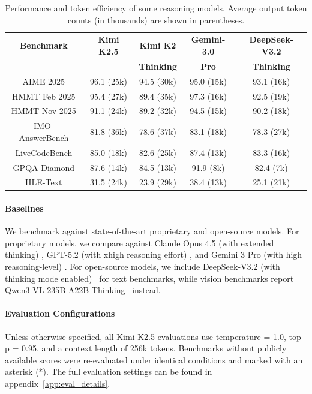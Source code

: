 

\begin{table}[htbp]
\centering
\hspace{0.3cm}
\caption{Performance and token efficiency of some reasoning models. Average output token counts (in thousands) are shown in parentheses.}
\begin{tabular}{cc|ccc}
\toprule
\textbf{Benchmark} & \textbf{Kimi K2.5} & \textbf{Kimi K2} & \textbf{Gemini-3.0} & \textbf{DeepSeek-V3.2} \\
 &  & \textbf{Thinking} & \textbf{Pro} & \textbf{Thinking} \\
\midrule
AIME 2025 & 96.1 (25k) & 94.5 (30k) & 95.0 (15k) & 93.1 (16k) \\
HMMT Feb 2025 & 95.4 (27k) & 89.4 (35k) & 97.3 (16k) & 92.5 (19k) \\
HMMT Nov 2025 & 91.1 (24k) & 89.2 (32k) & 94.5 (15k) & 90.2 (18k) \\
IMO-AnswerBench & 81.8 (36k) & 78.6 (37k) & 83.1 (18k) & 78.3 (27k) \\
LiveCodeBench & 85.0 (18k) & 82.6 (25k) & 87.4 (13k) & 83.3 (16k) \\
GPQA Diamond & 87.6 (14k) & 84.5 (13k) & 91.9 (8k) & 82.4 (7k) \\
HLE-Text  & 31.5 (24k) & 23.9 (29k) & 38.4 (13k) & 25.1 (21k) \\
\bottomrule
\end{tabular}
\label{tab:k2.5-te}
\end{table}

\paragraph{Baselines}
We benchmark against state-of-the-art proprietary and open-source models. For proprietary models, we compare against Claude Opus 4.5 (with extended thinking) \citep{opus45report}, GPT-5.2 (with xhigh reasoning effort) \citep{gpt52report}, and Gemini 3 Pro (with high reasoning-level) \citep{gemini3pro}. For open-source models, we include DeepSeek-V3.2 (with thinking mode enabled)~\citep{deepseekai2025deepseekv32pushingfrontieropen} for text benchmarks, while vision benchmarks report Qwen3-VL-235B-A22B-Thinking~\citep{bai2025qwen3vltechnicalreport} instead.

\paragraph{Evaluation Configurations}
Unless otherwise specified, all Kimi K2.5 evaluations use temperature = 1.0, top-p = 0.95, and a context length of 256k tokens. Benchmarks without publicly available scores were re-evaluated under identical conditions and marked with an asterisk (*). The full evaluation settings can be found in appendix~\ref{app:eval_details}.

